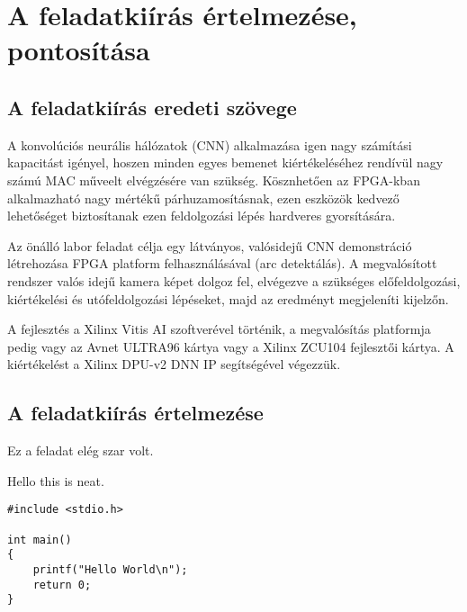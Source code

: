 \chapter{A feladatkiírás értelmezése, pontosítása}

\section{A feladatkiírás eredeti szövege}

A konvolúciós neurális hálózatok (CNN) alkalmazása igen nagy számítási kapacitást igényel, hoszen minden egyes bemenet kiértékeléséhez rendívül nagy számú MAC műveelt elvégzésére van szükség. Kösznhetően az FPGA-kban alkalmazható nagy mértékű párhuzamosításnak, ezen eszközök kedvező lehetőséget biztosítanak ezen feldolgozási lépés hardveres gyorsítására.

Az önálló labor feladat célja egy látványos, valósidejű CNN demonstráció létrehozása FPGA platform felhasználásával (arc detektálás). A megvalósított rendszer valós idejű kamera képet dolgoz fel, elvégezve a szükséges előfeldolgozási, kiértékelési és utófeldolgozási lépéseket, majd az eredményt megjeleníti kijelzőn.

A fejlesztés a Xilinx Vitis AI szoftverével történik, a megvalósítás platformja pedig vagy az Avnet ULTRA96 kártya vagy a Xilinx ZCU104 fejlesztői kártya. A kiértékelést a Xilinx DPU-v2 DNN IP segítségével végezzük.

\section{A feladatkiírás értelmezése}

Ez a feladat elég szar volt.

Hello this  is neat.

\begin{lstlisting}
#include <stdio.h>

int main()
{
    printf("Hello World\n");
    return 0;
}

\end{lstlisting}